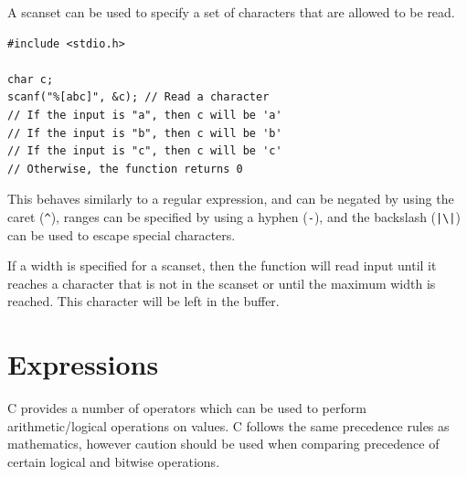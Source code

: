 \documentclass[a4paper]{report}
\begin{document}
A scanset can be used to specify a set of characters that are allowed to be read.
\begin{verbatim}
#include <stdio.h>

char c;
scanf("%[abc]", &c); // Read a character
// If the input is "a", then c will be 'a'
// If the input is "b", then c will be 'b'
// If the input is "c", then c will be 'c'
// Otherwise, the function returns 0
\end{verbatim}
This behaves similarly to a regular expression, and can be negated by using the caret (\texttt{^}),
ranges can be specified by using a hyphen (\texttt{-}), and the backslash (\texttt{|\backslash|}) can be used to escape special characters.

If a width is specified for a scanset, then the function will read input until it reaches a character that is not in the scanset or until the maximum width is reached. This
character will be left in the buffer.
\chapter{Expressions}
C provides a number of operators which can be used to perform arithmetic/logical operations on values.
C follows the same precedence rules as mathematics, however caution should be used when
comparing precedence of certain logical and bitwise operations.
\end{document}
